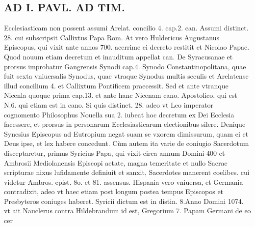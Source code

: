 \documentclass{article}
\begin{document}
\begin{pages}
\section*{AD I. PAVL. AD TIM. }
\marginpar{[ p.116 ]}\pstart Ecclesiasticam non possent assumi Arelat. concilio 4. cap.2. can. Assumi distinct. 28. cui subscripsit Callixtus Papa Rom. At vero Huldericus Augustanus Episcopus, qui vixit ante annos 700. acerrime ei decreto restitit et Nicolao Papae. Quod nouum etiam decretum et inauditum appellat can. De Syracusanae et prorsus improbatur Gangrensis Synodi cap.4. Synodo Constantinopolitana, quae fuit sexta vniuersalis Synodus, quae vtraque Synodus multis seculis et Arelatense illud concilium 4. et Callixtum Pontificem praecessit. Sed et ante vtranque Nicenla quoque prima cap.13. et ante hanc Nicenam cano. Apostolico, qui est N.6. qui etiam est in cano. Si quis distinct. 28. adeo vt Leo imperator cognomento Philosophus Nouella sua 2. iubeat hoc decretum ex Dei Ecclesia facessere, et prorsus in personarum Ecclesiasticarum electionibus silere. Denique Synesius Episcopus ad Eutropium negat suam se vxorem dimissurum, quam ei et Deus ipse, et lex habere concedunt. Cùm autem ita varie de coniugio Sacerdotum disceptaretur, primus Syricius Papa, qui vixit circa annum Domini 400 et Ambrosii Mediolanensis Episcopi aetate, magna temeritate et nullo Sacrae scripturae nixus lufidamente definiuit et sanxit, Sacerdotes manerent coelibes. cui videtur Ambros. epist. 8o. et 81. assensus. Hispania vero vniuersa, et Germania contradixit, adeo vt haec etiam post longum postea tempus Episcopos et Presbyteros coniuges haberet. Syricii dictum est in distin. 8.Anno Domini 1074. vt ait Nauclerus contra Hildebrandum id est, Gregorium 7. Papam Germani de eo cer\pend

\end{pages}
\end{document}
